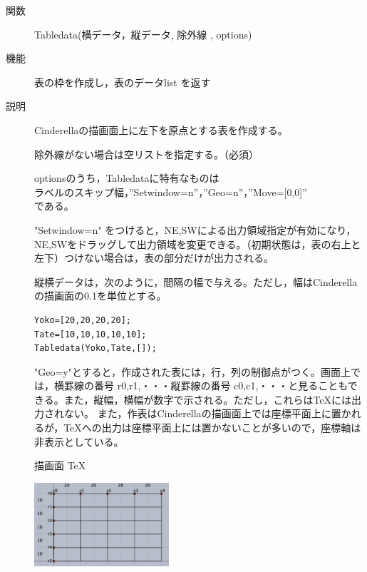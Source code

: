 \documentclass[papersize,a4paper,12pt,uplatex]{jsarticle}
\begin{document}
\begin{description}

\hypertarget{tabledata}{}
\item[関数]Tabledata(横データ，縦データ, 除外線 , options)
\item[機能]表の枠を作成し，表のデータlist を返す
\item[説明]Cinderellaの描画面上に左下を原点とする表を作成する。

除外線がない場合は空リストを指定する。（必須）

optionsのうち，Tabledataに特有なものは\\
\hspace*{3zw}ラベルのスキップ幅，''Setwindow=n''，''Geo=n''，''Move=[0,0]''\\
である。

"Setwindow=n" をつけると，NE,SWによる出力領域指定が有効になり，NE,SWをドラッグして出力領域を変更できる。（初期状態は，表の右上と左下）つけない場合は，表の部分だけが出力される。

縦横データは，次のように，間隔の幅で与える。ただし，幅はCinderellaの描画面の0.1を単位とする。

\begin{verbatim}
Yoko=[20,20,20,20];
Tate=[10,10,10,10,10];
Tabledata(Yoko,Tate,[]);
 \end{verbatim}



"Geo=y"とすると，作成された表には，行，列の制御点がつく。画面上では，横罫線の番号 r0,r1,・・・縦罫線の番号 c0,c1,・・・と見ることもできる。また，縦幅，横幅が数字で示される。ただし，これらは\TeX には出力されない。
また，作表はCinderellaの描画面上では座標平面上に置かれるが，\TeX への出力は座標平面上には置かないことが多いので，座標軸は非表示としている。

\hspace{25mm} 描画面 \hspace{45mm} TeX

\hspace{5mm}\includegraphics[bb=0 0 403.52 249.51 , width=5cm]{Fig/table01.pdf} \hspace{10mm} \\



\end{description}
\end{document}
